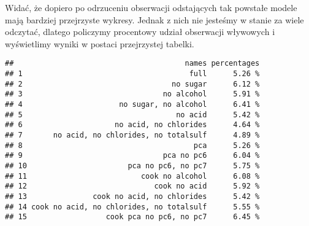 \documentclass[
]{article}
\newenvironment{Shaded}{\begin{snugshade}}{\end{snugshade}}
\newcommand{\AttributeTok}[1]{\textcolor[rgb]{0.13,0.29,0.53}{#1}}
\newcommand{\ControlFlowTok}[1]{\textcolor[rgb]{0.13,0.29,0.53}{\textbf{#1}}}
\newcommand{\DecValTok}[1]{\textcolor[rgb]{0.00,0.00,0.81}{#1}}
\newcommand{\FunctionTok}[1]{\textcolor[rgb]{0.13,0.29,0.53}{\textbf{#1}}}
\newcommand{\NormalTok}[1]{#1}
\newcommand{\OtherTok}[1]{\textcolor[rgb]{0.56,0.35,0.01}{#1}}
\newcommand{\SpecialCharTok}[1]{\textcolor[rgb]{0.81,0.36,0.00}{\textbf{#1}}}
\newcommand{\StringTok}[1]{\textcolor[rgb]{0.31,0.60,0.02}{#1}}
\begin{document}
Widać, że dopiero po odrzuceniu obserwacji odstających tak powstałe
modele mają bardziej przejrzyste wykresy. Jednak z nich nie jesteśmy w
stanie za wiele odczytać, dlatego policzymy procentowy udział obserwacji
wływowych i wyświetlimy wyniki w postaci przejrzystej tabelki.

\begin{Shaded}
\end{Shaded}

\begin{verbatim}
##                                       names percentages
## 1                                      full      5.26 %
## 2                                  no sugar      6.12 %
## 3                                no alcohol      5.91 %
## 4                      no sugar, no alcohol      6.41 %
## 5                                   no acid      5.42 %
## 6                     no acid, no chlorides      4.64 %
## 7       no acid, no chlorides, no totalsulf      4.89 %
## 8                                       pca      5.26 %
## 9                                pca no pc6      6.04 %
## 10                       pca no pc6, no pc7      5.75 %
## 11                          cook no alcohol      6.08 %
## 12                             cook no acid      5.92 %
## 13               cook no acid, no chlorides      5.42 %
## 14 cook no acid, no chlorides, no totalsulf      5.55 %
## 15                  cook pca no pc6, no pc7      6.45 %
\end{verbatim}
\end{document}
